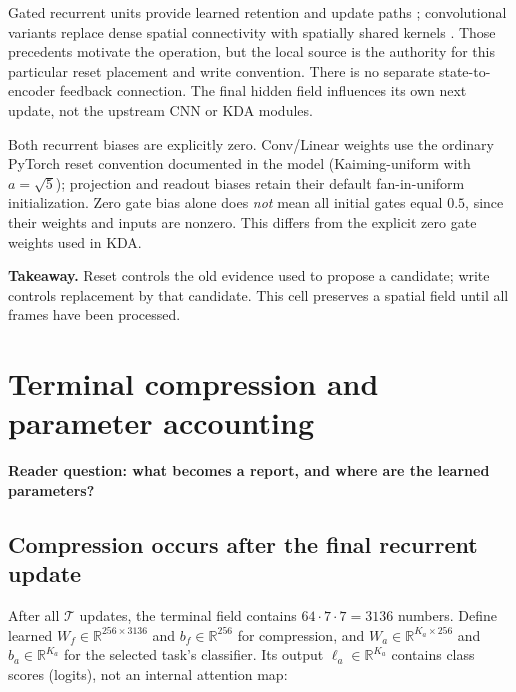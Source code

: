 \documentclass[10pt,letterpaper]{article}
\newcommand{\R}{\mathbb{R}}
\newcommand{\takeaway}[1]{\par\smallskip\noindent\textbf{Takeaway.} #1}
\newcommand{\psection}[1]{\clearpage\section{#1}}
\begin{document}
Gated recurrent units provide learned retention and update paths \cite{gru}; convolutional variants replace dense spatial connectivity with spatially shared kernels \cite{convgru}. Those precedents motivate the operation, but the local source is the authority for this particular reset placement and write convention. There is no separate state-to-encoder feedback connection. The final hidden field influences its own next update, not the upstream CNN or KDA modules.

Both recurrent biases are explicitly zero. Conv/Linear weights use the ordinary PyTorch reset convention documented in the model (Kaiming-uniform with $a=\sqrt5$); projection and readout biases retain their default fan-in-uniform initialization. Zero gate bias alone does \emph{not} mean all initial gates equal $0.5$, since their weights and inputs are nonzero. This differs from the explicit zero gate weights used in KDA.

\takeaway{Reset controls the old evidence used to propose a candidate; write controls replacement by that candidate. This cell preserves a spatial field until all frames have been processed.}

\psection{Terminal compression and parameter accounting}
\textbf{Reader question: what becomes a report, and where are the learned parameters?}
\subsection{Compression occurs after the final recurrent update}
After all $\mathcal T$ updates, the terminal field contains $64\cdot7\cdot7=3136$ numbers. Define learned $W_f\in\R^{256\times3136}$ and $b_f\in\R^{256}$ for compression, and $W_a\in\R^{K_a\times256}$ and $b_a\in\R^{K_a}$ for the selected task's classifier. Its output $\ell_a\in\R^{K_a}$ contains class scores (logits), not an internal attention map:
\end{document}
